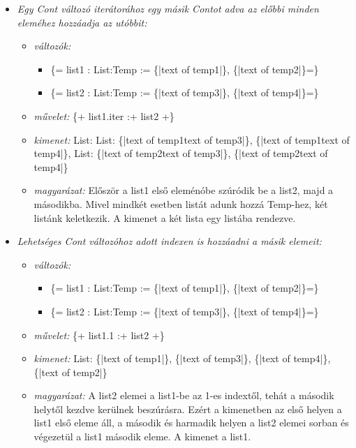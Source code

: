 {\begin{itemize}
\item \emph{ Egy Cont változó iterátorához egy másik Contot adva az előbbi minden eleméhez hozzáadja az utóbbit:}
\begin{itemize}
\item \emph{változók:}
\begin{itemize}
\item \{= list1 : List:Temp  := \{|text of temp1|\}, \{|text of temp2|\}=\}
\item \{= list2 : List:Temp  := \{|text of temp3|\}, \{|text of temp4|\}=\}
\end{itemize}
\item \emph{művelet:}
\{+ list1.iter :+ list2 +\}
\item \emph{kimenet:}
List: List: \{|text of temp1text of temp3|\}, \{|text of temp1text of temp4|\}, List: \{|text of temp2text of temp3|\}, \{|text of temp2text of temp4|\}
\item \emph{magyarázat:}
Először a list1 első eleménóbe szúródik be a list2, majd a másodikba.
Mivel mindkét esetben listát adunk hozzá Temp-hez, két listánk keletkezik.
A kimenet a két lista egy listába rendezve.
\end{itemize}

\item \emph{ Lehetséges Cont változóhoz adott indexen is hozzáadni a másik elemeit:}
\begin{itemize}
\item \emph{változók:}
\begin{itemize}
\item \{= list1 : List:Temp  := \{|text of temp1|\}, \{|text of temp2|\}=\}
\item \{= list2 : List:Temp  := \{|text of temp3|\}, \{|text of temp4|\}=\}
\end{itemize}
\item \emph{művelet:}
\{+ list1.1 :+ list2 +\}
\item \emph{kimenet:}
List: \{|text of temp1|\}, \{|text of temp3|\}, \{|text of temp4|\}, \{|text of temp2|\}
\item \emph{magyarázat:}
A list2 elemei a list1-be az 1-es indextől, tehát a második helytől kezdve kerülnek beszúrásra.
Ezért a kimenetben az első helyen a list1 első eleme áll, a második és harmadik helyen a list2 elemei sorban és végezetül a list1 második eleme.
A kimenet a list1.
\end{itemize}


\end{itemize}}
